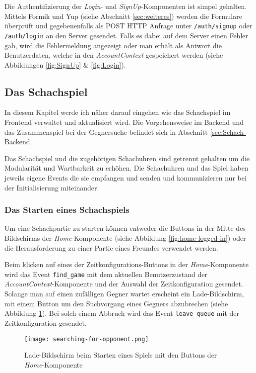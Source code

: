 Die Authentifizierung der \textit{Login}- und \textit{SignUp}-Komponenten ist simpel gehalten. Mittels Formik und Yup (siehe Abschnitt \ref{sec:weiteres}) werden die Formulare überprüft und gegebenenfalls als POST HTTP Anfrage unter \verb|/auth/signup| oder \verb|/auth/login| an den Server gesendet. Falls es dabei auf dem Server einen Fehler gab, wird die Fehlermeldung angezeigt oder man erhält als Antwort die Benutzerdaten, welche in den \textit{AccountContext} gespeichert werden (siehe Abbildungen \ref{fig:SignUp} \& \ref{fig:Login}).
        
        \subsection{Das Schachspiel}
        \label{sec:Schachspiel}
        In diesem Kapitel werde ich näher darauf eingehen wie das Schachspiel im Frontend verwaltet und aktualisiert wird. Die Vorgehensweise im Backend und das Zusammenspiel bei der Gegnersuche befindet sich in Abschnitt \ref{sec:Schach-Backend}.
        
Das Schachspiel und die zugehörigen Schachuhren sind getrennt gehalten um die Modularität und Wartbarkeit zu erhöhen. Die Schachuhren und das Spiel haben jeweils eigene Events die sie empfangen und senden und kommunizieren nur bei der Initialisierung miteinander.
		\subsubsection{Das Starten eines Schachspiels}
		\label{sec:Frontend-Schach-Start}
Um eine Schachpartie zu starten können entweder die Buttons in der Mitte des Bildschirms der \textit{Home}-Komponente (siehe Abbildung \ref{fig:home-logged-in}) oder die Herausforderung zu einer Partie eines Freundes verwendet werden.

Beim klicken auf eines der Zeitkonfigurations-Buttons in der \textit{Home}-Komponente wird das Event \verb|find_game| mit dem aktuellen Benutzerzustand der \textit{AccountContext}-Komponente und der Auswahl der Zeitkonfiguration gesendet. Solange man auf einen zufälligen Gegner wartet erscheint ein Lade-Bildschirm, mit einem Button um den Suchvorgang eines Gegners abzubrechen (siehe Abbildung \ref{fig:searching-for-opponent}). Bei solch einem Abbruch wird das Event \verb|leave_queue| mit der Zeitkonfiguration gesendet.

\begin{figure}[h]
\centering
\texttt{[image: searching-for-opponent.png]}
\caption{Lade-Bildschirm beim Starten eines Spiels mit den Buttons der \textit{Home}-Komponente}
\label{fig:searching-for-opponent}
\end{figure}

